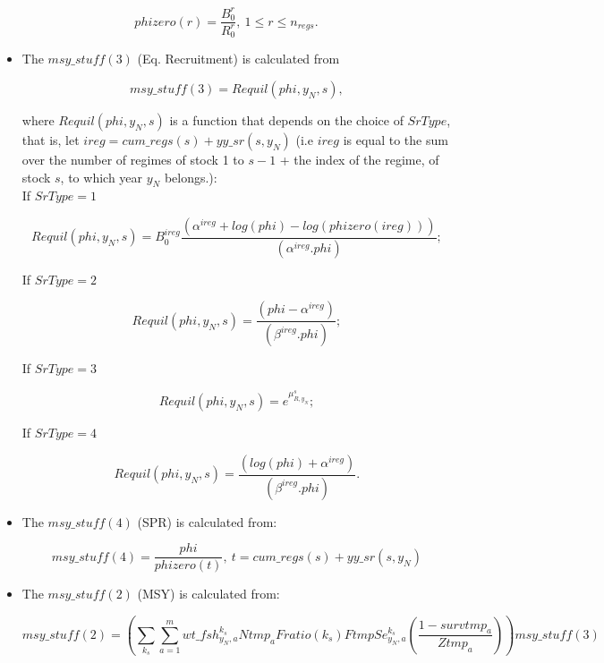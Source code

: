 \documentclass{article}
\begin{document}
\begin{equation}
    phizero(r)=\dfrac{B_0^r}{R_0^r}, \ 1\leq r \leq n_{regs}.
\end{equation}
\begin{itemize}
\item The $msy\_stuff(3)$ (Eq. Recruitment) is calculated from

\begin{equation}
    msy\_stuff(3)  = Requil(phi,y_N,s),
\end{equation}

where $Requil(phi,y_N,s)$ is a function that depends on the choice of $SrType$, that is, let $ireg=cum\_regs(s)+yy\_sr(s,y_N)$ (i.e $ireg$ is equal to the sum over the number of regimes of stock 1 to $s-1$ + the index of the regime, of stock $s$, to which year $y_N$ belongs.):\\

If $SrType=1$

\begin{equation}\label{eq: rec1}
    Requil(phi,y_N,s)=B_0^{ireg} \dfrac{(\alpha^{ireg} + log(phi) - log(phizero(ireg)) )} {(\alpha^{ireg}. phi)};
\end{equation}

If $SrType=2$

\begin{equation}
Requil(phi,y_N,s)=\dfrac{(phi-\alpha^{ireg})}{(\beta^{ireg}.phi)};
\end{equation}

If $SrType=3$

\begin{equation}
    Requil(phi,y_N,s)=e^{\mu^s_{R,y_N}};
\end{equation}

If $SrType=4$

\begin{equation} \label{eq: rec2}
    Requil(phi,y_N,s)=\dfrac{(log(phi)+\alpha^{ireg})}{(\beta^{ireg}.phi)}.
\end{equation}

\item The $msy\_stuff(4)$ (SPR) is calculated from:

\begin{equation}
    msy\_stuff(4)=\dfrac{phi}{phizero(t)}, \ t=cum\_regs(s)+yy\_sr(s,y_N)
\end{equation}

\item The $msy\_stuff(2)$ (MSY) is calculated from:

\begin{equation} \label{msystuff2}
    msy\_stuff(2) = \left(\sum_{k_s}\sum_{a=1}^m wt\_fsh^{k_s}_{y_N,a}Ntmp_aFratio(k_s)Ftmp Se^{k_s}_{y_N,a}\left(\dfrac{1-survtmp_a}{Ztmp_a}\right)\right) msy\_stuff(3)
\end{equation}


\end{itemize}
\end{document}
